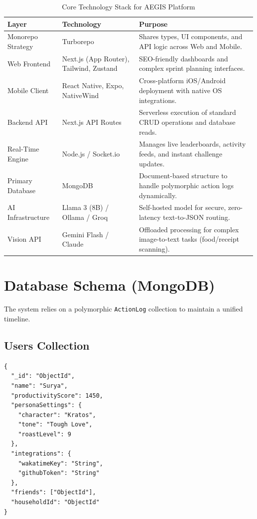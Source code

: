 \documentclass[11pt,oneside]{article}
\begin{document}
\begin{table}[h]
\centering
\begin{tabular}{|p{2.5cm}|p{3cm}|p{5cm}|}
\hline
\textbf{Layer} & \textbf{Technology} & \textbf{Purpose} \\
\hline
Monorepo Strategy & Turborepo & Shares types, UI components, and API logic across Web and Mobile. \\
\hline
Web Frontend & Next.js (App Router), Tailwind, Zustand & SEO-friendly dashboards and complex sprint planning interfaces. \\
\hline
Mobile Client & React Native, Expo, NativeWind & Cross-platform iOS/Android deployment with native OS integrations. \\
\hline
Backend API & Next.js API Routes & Serverless execution of standard CRUD operations and database reads. \\
\hline
Real-Time Engine & Node.js / Socket.io & Manages live leaderboards, activity feeds, and instant challenge updates. \\
\hline
Primary Database & MongoDB & Document-based structure to handle polymorphic action logs dynamically. \\
\hline
AI Infrastructure & Llama 3 (8B) / Ollama / Groq & Self-hosted model for secure, zero-latency text-to-JSON routing. \\
\hline
Vision API & Gemini Flash / Claude & Offloaded processing for complex image-to-text tasks (food/receipt scanning). \\
\hline
\end{tabular}
\caption{Core Technology Stack for AEGIS Platform}
\end{table}

\section{Database Schema (MongoDB)}

The system relies on a polymorphic \texttt{ActionLog} collection to maintain a unified timeline.

\subsection*{Users Collection}

\begin{lstlisting}
{
  "_id": "ObjectId",
  "name": "Surya",
  "productivityScore": 1450,
  "personaSettings": {
    "character": "Kratos",
    "tone": "Tough Love",
    "roastLevel": 9
  },
  "integrations": {
    "wakatimeKey": "String",
    "githubToken": "String"
  },
  "friends": ["ObjectId"],
  "householdId": "ObjectId"
}
\end{lstlisting}
\end{document}
